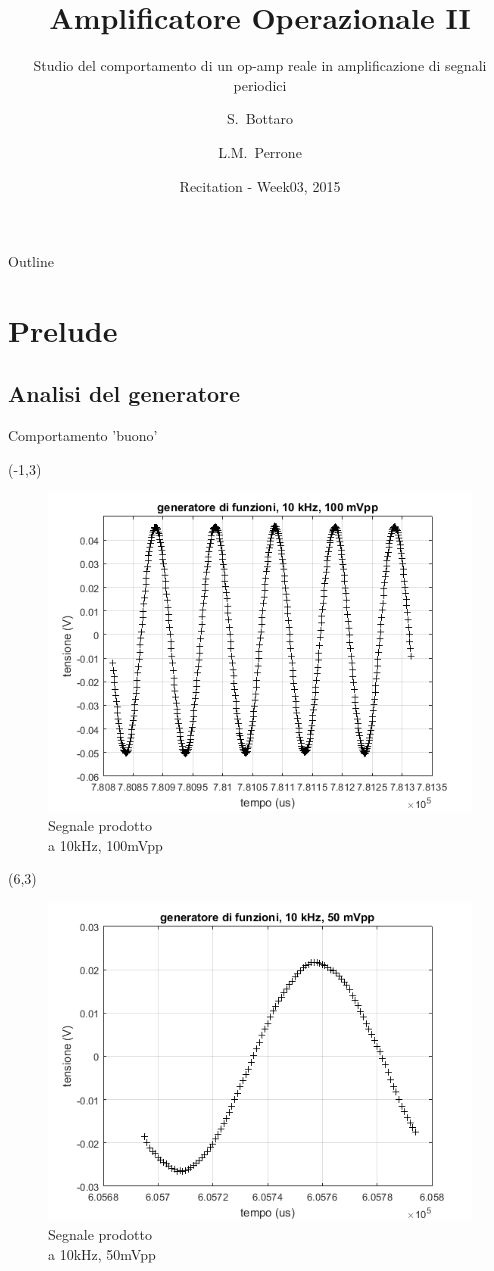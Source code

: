 \documentclass{beamer}
\title{Amplificatore Operazionale II}
\subtitle{Studio del comportamento di un op-amp reale in amplificazione di segnali periodici}
\author{S.~Bottaro\inst{1} \and L.M.~Perrone\inst{1}}
\institute[Unipi] %
{
  \inst{1}%
  Dipartimento di Fisica\\
  Universita' di Pisa
}
\date{Recitation - Week03, 2015}
\begin{document}
\begin{frame}
  \titlepage
\end{frame}

\begin{frame}{Outline}
  \tableofcontents
\end{frame}


\section{Prelude}
\subsection{Analisi del generatore}

\begin{frame}{Comportamento 'buono'}

\begin{textblock}{12}(-1,3)
\begin{figure}
\centering
\includegraphics[width=0.6\linewidth]{./prova_gen_10khz_100mpp}
\caption{Segnale prodotto \\
a 10kHz, 100mVpp}
\label{fig:prova_gen_10khz_100mpp}
\end{figure}
\end{textblock}


\begin{textblock}{12}(6,3)
\begin{figure}
\centering
\includegraphics[width=0.6\linewidth]{./prova_gen_10khz_50mpp}
\caption{Segnale prodotto \\
a 10kHz, 50mVpp}
\label{fig:prova_gen_10khz_50mpp}
\end{figure}
\end{textblock}


\end{frame}
\end{document}
